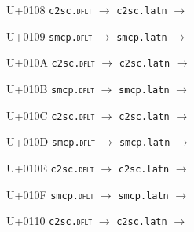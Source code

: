\documentclass{article}
\begin{document}
\begin{substitutions}
U+0108  \linebreak
    \texttt{c2sc.\textsc{dflt}} $\to$  \linebreak
    \texttt{c2sc.latn} $\to$  

\goodbreak

U+0109  \linebreak
    \texttt{smcp.\textsc{dflt}} $\to$  \linebreak
    \texttt{smcp.latn} $\to$  

\goodbreak

U+010A  \linebreak
    \texttt{c2sc.\textsc{dflt}} $\to$  \linebreak
    \texttt{c2sc.latn} $\to$  

\goodbreak

U+010B  \linebreak
    \texttt{smcp.\textsc{dflt}} $\to$  \linebreak
    \texttt{smcp.latn} $\to$  

\goodbreak

U+010C  \linebreak
    \texttt{c2sc.\textsc{dflt}} $\to$  \linebreak
    \texttt{c2sc.latn} $\to$  

\goodbreak

U+010D  \linebreak
    \texttt{smcp.\textsc{dflt}} $\to$  \linebreak
    \texttt{smcp.latn} $\to$  

\goodbreak

U+010E  \linebreak
    \texttt{c2sc.\textsc{dflt}} $\to$  \linebreak
    \texttt{c2sc.latn} $\to$  

\goodbreak

U+010F  \linebreak
    \texttt{smcp.\textsc{dflt}} $\to$  \linebreak
    \texttt{smcp.latn} $\to$  

\goodbreak

U+0110  \linebreak
    \texttt{c2sc.\textsc{dflt}} $\to$  \linebreak
    \texttt{c2sc.latn} $\to$  


\end{substitutions}
\end{document}

